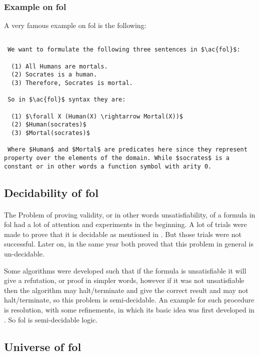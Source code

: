 \subsubsection{Example on \ac{fol}}
A very famous example on \ac{fol} is the following:
\begin{lstlisting}[caption=Example on \ac{fol},mathescape,breaklines=true,frame=single]

 We want to formulate the following three sentences in $\ac{fol}$:

  (1) All Humans are mortals.
  (2) Socrates is a human.
  (3) Therefore, Socrates is mortal.
  
 So in $\ac{fol}$ syntax they are:

  (1) $\forall X (Human(X) \rightarrow Mortal(X))$
  (2) $Human(socrates)$
  (3) $Mortal(socrates)$
  
 Where $Human$ and $Mortal$ are predicates here since they represent property over the elements of the domain. While $socrates$ is a constant or in other words a function symbol with arity 0. 

\end{lstlisting}


\subsection{Decidability of \ac{fol}}
\paragraph{}
The Problem of proving validity, or in other words unsatisfiability, of a formula in \acf{fol} had a lot of attention and experiments in the beginning. A lot of trials were made to prove that it is decidable as mentioned in \cite{SL_14}. But those trials were not successful. Later on, in the same year both \cite{DEC_TUR, DEC_CHURCH} proved that this problem in general is un-decidable.


Some algorithms were developed such that if the formula is unsatisfiable it will give a refutation, or proof in simpler words, however if it was not unsatisfiable then the algorithm may halt/terminate and give the correct result and may not halt/terminate, so this problem is semi-decidable. An example for such procedure is resolution, with some refinements, in which its basic idea was first developed in \cite{RES_65}. So \acf{fol} is semi-decidable logic.

\subsection{Universe of \ac{fol}}


\begin{comment}
	

	

	

	
\end{comment}


   